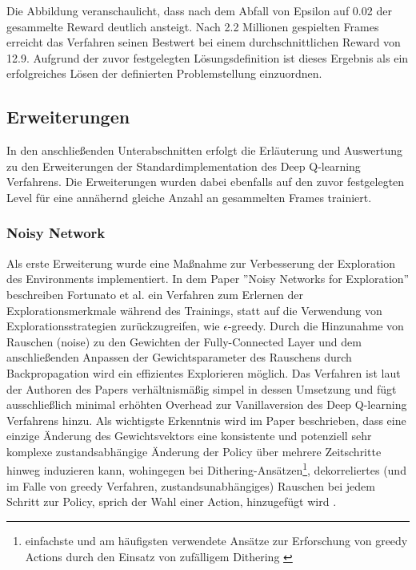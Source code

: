 \documentclass[11pt]{scrartcl}
\begin{document}
\newpage
Die Abbildung veranschaulicht, dass nach dem Abfall von Epsilon auf 0.02 der gesammelte Reward deutlich
ansteigt. Nach 2.2 Millionen gespielten Frames erreicht das Verfahren seinen Bestwert bei einem
durchschnittlichen Reward von 12.9. Aufgrund der zuvor festgelegten Lösungsdefinition ist dieses
Ergebnis als ein erfolgreiches Lösen der definierten Problemstellung einzuordnen.

\subsection{Erweiterungen}
In den anschließenden Unterabschnitten erfolgt die Erläuterung und Auswertung zu den
Erweiterungen der Standardimplementation des Deep Q-learning Verfahrens. Die Erweiterungen
wurden dabei ebenfalls auf den zuvor festgelegten Level für eine annähernd gleiche Anzahl
an gesammelten Frames trainiert.

\subsubsection{Noisy Network}
Als erste Erweiterung wurde eine Maßnahme zur Verbesserung der Exploration des Environments implementiert.
In dem Paper ''Noisy Networks for Exploration'' beschreiben Fortunato et al.\cite[~S.1 f.]{FAPMOGM2017}
ein Verfahren zum Erlernen der Explorationsmerkmale während des Trainings, statt auf die Verwendung von
Explorationsstrategien zurückzugreifen, wie $\epsilon$-greedy. Durch die Hinzunahme von Rauschen (noise)
zu den Gewichten der Fully-Connected Layer und dem anschließenden Anpassen der Gewichtsparameter des
Rauschens durch Backpropagation wird ein effizientes Explorieren möglich. Das Verfahren ist laut der
Authoren des Papers verhältnismäßig simpel in dessen Umsetzung und fügt ausschließlich minimal erhöhten
Overhead zur Vanillaversion des Deep Q-learning Verfahrens hinzu. Als wichtigste Erkenntnis wird im Paper
beschrieben, dass eine einzige Änderung des Gewichtsvektors eine konsistente und potenziell sehr komplexe
zustandsabhängige Änderung der Policy über mehrere Zeitschritte hinweg induzieren kann, wohingegen bei
Dithering-Ansätzen\footnote{einfachste und am häufigsten verwendete Ansätze zur Erforschung von greedy
Actions durch den Einsatz von zufälligem Dithering \cite[~S.2]{ORRW2019}}, dekorreliertes (und im Falle von
greedy Verfahren, zustandsunabhängiges) Rauschen bei jedem Schritt zur Policy, sprich der Wahl einer
Action, hinzugefügt wird \cite[~S.2]{FAPMOGM2017}. 
\end{document}
